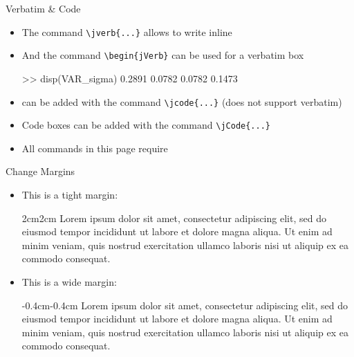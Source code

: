 \documentclass[10pt,itemsep]{beamer}
\begin{document}
\begin{frame}[fragile]
    {Verbatim \& Code}
    \begin{itemize}
        \item The command \texttt{\textbackslash jverb\{...\}} allows to write inline  
        \item And  the command \texttt{\textbackslash begin\{jVerb\}} can be used for a verbatim box 
        \begin{jVerb}
        >> disp(VAR_sigma)
        0.2891    0.0782
        0.0782    0.1473
        \end{jVerb}
        \item {} can be added with the command \texttt{\textbackslash jcode\{...\}} (does not support verbatim)
        \item Code boxes can be added with the command \texttt{\textbackslash jCode\{...\}} \par
        \item All commands in this page require \jverb{\begin{frame}[fragile]} 
    \end{itemize}
\end{frame}
\shownotesblock{}

\begin{frame}
    {Change Margins}
    \begin{itemize}
        \item This is a tight margin: 
        \begin{changemargin}{2cm}{2cm}
            Lorem ipsum dolor sit amet, consectetur adipiscing elit, sed do eiusmod tempor incididunt ut labore et dolore magna aliqua. Ut enim ad minim veniam, quis nostrud exercitation ullamco laboris nisi ut aliquip ex ea commodo consequat. 
        \end{changemargin}\bigskip
        \item This is a wide margin: 
        \begin{changemargin}{-0.4cm}{-0.4cm}
            Lorem ipsum dolor sit amet, consectetur adipiscing elit, sed do eiusmod tempor incididunt ut labore et dolore magna aliqua. Ut enim ad minim veniam, quis nostrud exercitation ullamco laboris nisi ut aliquip ex ea commodo consequat. 
        \end{changemargin}
    \end{itemize}
\end{frame}
\shownotesblock{}
\end{document}
